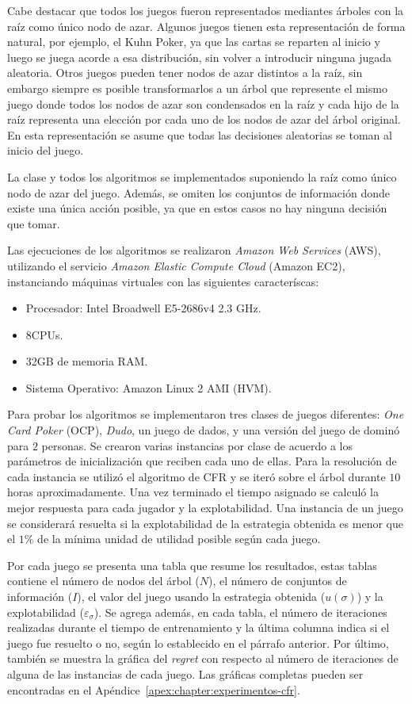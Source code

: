 Cabe destacar que todos los juegos fueron representados mediantes árboles con la raíz como único nodo de azar. Algunos juegos tienen esta representación de forma natural, por ejemplo, el Kuhn Poker, ya que las cartas se reparten al inicio y luego se juega acorde a esa distribución, sin volver a introducir ninguna jugada aleatoria. Otros juegos pueden tener nodos de azar distintos a la raíz, sin embargo siempre es posible transformarlos a un árbol que represente el mismo juego donde todos los nodos de azar son condensados en la raíz y cada hijo de la raíz representa una elección por cada uno de los nodos de azar del árbol original. En esta representación se asume que todas las decisiones aleatorias se toman al inicio del juego.

La clase  y todos los algoritmos se implementados suponiendo la raíz como único nodo de azar del juego. Además, se omiten los conjuntos de información donde existe una única acción posible, ya que en estos casos no hay ninguna decisión que tomar.

Las ejecuciones de los algoritmos se realizaron \textit{Amazon Web Services} (AWS), utilizando el servicio \textit{Amazon Elastic Compute Cloud} (Amazon EC2), instanciando máquinas virtuales con las siguientes caracteríscas:
\begin{itemize}[noitemsep]
    \item Procesador: Intel Broadwell E5-2686v4 2.3 GHz.
    \item 8CPUs.
    \item 32GB de memoria RAM.
    \item Sistema Operativo: Amazon Linux 2 AMI (HVM).
\end{itemize}

Para probar los algoritmos se implementaron tres clases de juegos diferentes: \textit{One Card Poker} (OCP), \textit{Dudo}, un juego de dados, y una versión del juego de dominó para $2$ personas. Se crearon varias instancias por clase de acuerdo a los parámetros de inicialización que reciben cada uno de ellas. Para la resolución de cada instancia se utilizó el algoritmo de CFR y se iteró sobre el árbol durante $10$ horas aproximadamente. Una vez terminado el tiempo asignado se calculó la mejor respuesta para cada jugador y la explotabilidad. Una instancia de un juego se considerará resuelta si la explotabilidad de la estrategia obtenida es menor que el $1\%$ de la mínima unidad de utilidad posible según cada juego.
 
Por cada juego se presenta una tabla que resume los resultados, estas tablas contiene el número de nodos del árbol ($N$), el número de conjuntos de información ($I$), el valor del juego usando la estrategia obtenida ($u({\sigma})$) y la explotabilidad ($\varepsilon_{\sigma}$). Se agrega además, en cada tabla, el número de iteraciones realizadas durante el tiempo de entrenamiento y la última columna indica si el juego fue resuelto o no, según lo establecido en el párrafo anterior. Por último, también se muestra la gráfica del \textit{regret} con respecto al número de iteraciones de alguna de las instancias de cada juego. Las gráficas completas pueden ser encontradas en el Apéndice~\ref{apex:chapter:experimentos-cfr}.

